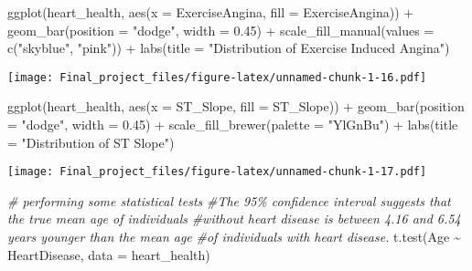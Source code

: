 \documentclass[
]{article}
\newenvironment{Shaded}{\begin{snugshade}}{\end{snugshade}}
\newcommand{\AttributeTok}[1]{\textcolor[rgb]{0.77,0.63,0.00}{#1}}
\newcommand{\CommentTok}[1]{\textcolor[rgb]{0.56,0.35,0.01}{\textit{#1}}}
\newcommand{\FloatTok}[1]{\textcolor[rgb]{0.00,0.00,0.81}{#1}}
\newcommand{\FunctionTok}[1]{\textcolor[rgb]{0.00,0.00,0.00}{#1}}
\newcommand{\NormalTok}[1]{#1}
\newcommand{\SpecialCharTok}[1]{\textcolor[rgb]{0.00,0.00,0.00}{#1}}
\newcommand{\StringTok}[1]{\textcolor[rgb]{0.31,0.60,0.02}{#1}}
\begin{document}
\begin{Shaded}
\begin{Highlighting}[]
\FunctionTok{ggplot}\NormalTok{(heart\_health, }\FunctionTok{aes}\NormalTok{(}\AttributeTok{x =}\NormalTok{ ExerciseAngina, }\AttributeTok{fill =}\NormalTok{ ExerciseAngina)) }\SpecialCharTok{+}
  \FunctionTok{geom\_bar}\NormalTok{(}\AttributeTok{position =} \StringTok{"dodge"}\NormalTok{, }\AttributeTok{width =} \FloatTok{0.45}\NormalTok{) }\SpecialCharTok{+}
  \FunctionTok{scale\_fill\_manual}\NormalTok{(}\AttributeTok{values =} \FunctionTok{c}\NormalTok{(}\StringTok{"skyblue"}\NormalTok{, }\StringTok{"pink"}\NormalTok{)) }\SpecialCharTok{+}
  \FunctionTok{labs}\NormalTok{(}\AttributeTok{title =} \StringTok{"Distribution of Exercise Induced Angina"}\NormalTok{)}
\end{Highlighting}
\end{Shaded}

\texttt{[image: Final\_project\_files/figure-latex/unnamed-chunk-1-16.pdf]}

\begin{Shaded}
\begin{Highlighting}[]
\FunctionTok{ggplot}\NormalTok{(heart\_health, }\FunctionTok{aes}\NormalTok{(}\AttributeTok{x =}\NormalTok{ ST\_Slope, }\AttributeTok{fill =}\NormalTok{ ST\_Slope)) }\SpecialCharTok{+}
  \FunctionTok{geom\_bar}\NormalTok{(}\AttributeTok{position =} \StringTok{"dodge"}\NormalTok{, }\AttributeTok{width =} \FloatTok{0.45}\NormalTok{) }\SpecialCharTok{+}
  \FunctionTok{scale\_fill\_brewer}\NormalTok{(}\AttributeTok{palette =} \StringTok{"YlGnBu"}\NormalTok{) }\SpecialCharTok{+}
  \FunctionTok{labs}\NormalTok{(}\AttributeTok{title =} \StringTok{"Distribution of ST Slope"}\NormalTok{)}
\end{Highlighting}
\end{Shaded}

\texttt{[image: Final\_project\_files/figure-latex/unnamed-chunk-1-17.pdf]}

\begin{Shaded}
\begin{Highlighting}[]
\CommentTok{\# performing some statistical tests}
\CommentTok{\#The 95\% confidence interval suggests that the true mean age of individuals }
\CommentTok{\#without heart disease is between 4.16 and 6.54 years younger than the mean age }
\CommentTok{\#of individuals with heart disease.}
\FunctionTok{t.test}\NormalTok{(Age }\SpecialCharTok{\textasciitilde{}}\NormalTok{ HeartDisease, }\AttributeTok{data =}\NormalTok{ heart\_health)}
\end{Highlighting}
\end{Shaded}
\end{document}
